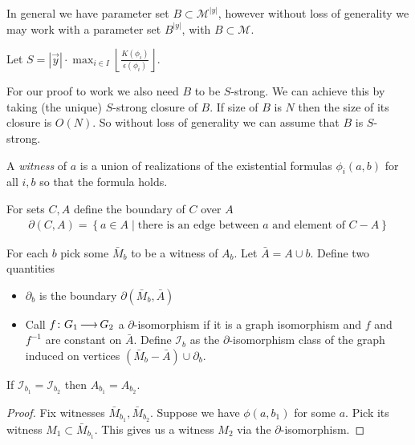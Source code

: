 \documentclass{amsart}
\newcommand{\II}{\mathscr I}
\newcommand{\MM}{\mathscr M}
\newcommand{\curly}[1]{\left\{#1\right\}}
\providecommand{\floor}[1]{\left \lfloor #1 \right \rfloor }
\begin{document}
In general we have parameter set $B \subset \MM^{|y|}$, however without loss of generality we may work with
a parameter set $B^{|y|}$, with $B \subset \MM$.

Let $S = |\vec y| \cdot \max_{i \in I} \floor{\frac{K(\phi_i)}{\epsilon(\phi_i)}}$.

For our proof to work we also need $B$ to be $S$-strong.
We can achieve this by taking (the unique) $S$-strong closure of $B$.
If size of $B$ is $N$ then the size of its closure is $O(N)$.	%
So without loss of generality we can assume that $B$ is $S$-strong.

\begin{Definition}
	A \emph{witness} of $a$ is a union of realizations of the existential formulas $\phi_i(a, b)$ for all $i, b$ so that the formula holds.
\end{Definition}



\begin{Definition}
	For sets $C, A$ define the boundary of $C$ over $A$
	\begin{align*}
		\partial(C, A) = \curly{a \in A \mid \text{there is an edge between $a$ and element of $C - A$}}
	\end{align*}
\end{Definition}

\begin{Definition}
	For each $b$ pick some $\bar M_b$ to be a witness of $A_b$.
	Let $\bar A = A \cup b$.
	Define two quantities
	\begin{itemize}
		\item $\partial_b$ is the boundary $\partial(\bar M_b, \bar A)$
		\item Call $f \colon G_1 \operatorname{\longrightarrow} G_2$ a $\partial$-isomorphism if it is a graph isomorphism and $f$ and $f^{-1}$ are constant on $\bar A$.
		Define $\II_b$ as the $\partial$-isomorphism class of the graph induced on vertices $(\bar M_b - \bar A) \cup \partial_b$. %
	\end{itemize}
\end{Definition}

\begin{Lemma} \label {bound_trace}
	If $\II_{b_1} = \II_{b_2}$ then $A_{b_1} = A_{b_2}$.
\end{Lemma}

\begin{proof}
	Fix witnesses $\bar M_{b_1}, \bar M_{b_2}$.
	Suppose we have $\phi(a, b_1)$ for some $a$.
	Pick its witness $M_1 \subset \bar M_{b_1}$.
	This gives us a witness $M_2$ via the $\partial$-isomorphism.
\end{proof}
\end{document}
